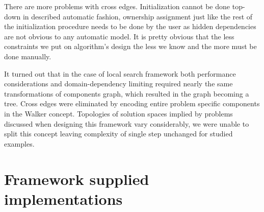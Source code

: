 There are more problems with cross edges. Initialization cannot be done
top-down in described automatic fashion, ownership assignment just like the
rest of the initialization procedure needs to be done by the user as hidden
dependencies are not obvious to any automatic model. It is pretty obvious that
the less constraints we put on algorithm's design the less we know and the more
must be done manually.

It turned out that in the case of local search framework both performance
considerations and domain-dependency limiting required nearly the same
transformations of components graph, which resulted in the graph becoming a
tree. Cross edges were eliminated by encoding entire problem specific
components in the Walker concept. Topologies of solution spaces implied by
problems discussed when designing this framework vary considerably, we were
unable to split this concept leaving complexity of single step unchanged for
studied examples.

\section{Framework supplied implementations}
